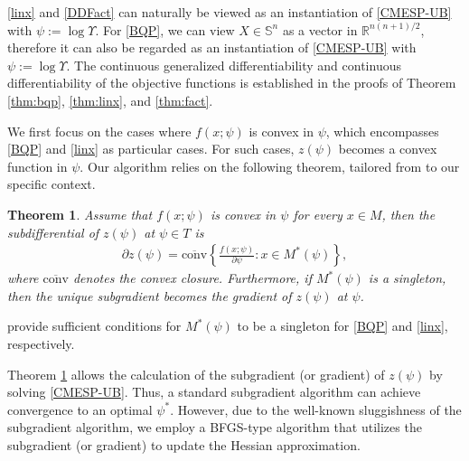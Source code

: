 \documentclass[smallextended]{svjour3hack}       %
\newtheorem{thm}{Theorem}{\bf}{\rm}
\begin{document}
\begin{remark}
    \ref{linx} and \ref{DDFact} can naturally be viewed as an instantiation of \ref{CMESP-UB} with $\psi:=\log \Upsilon$. For \ref{BQP}, we can view $X\in \mathbb{S}^n$ as a vector in $\mathbb{R}^{n(n+1)/2}$, therefore it can also be regarded as an instantiation of \ref{CMESP-UB} with $\psi:=\log \Upsilon$. The continuous generalized differentiability and continuous differentiability of the objective functions is established in the proofs of Theorem \ref{thm:bqp}, \ref{thm:linx}, and \ref{thm:fact}.
\end{remark}

We first focus on the cases where $f(x;\psi)$ is convex in $\psi$, which encompasses \ref{BQP} and \ref{linx} as particular cases. For such cases, $z(\psi)$ becomes a convex function in $\psi$. Our algorithm relies on the following theorem, tailored from \cite[Theorem 2.4.18]{zalinescu2002convex} to our specific context.
\begin{thm}{\cite[Theorem 2.4.18]{zalinescu2002convex}}\label{alg:cvxdifferential}
    Assume that $f(x;\psi)$ is convex in $\psi$ for every $x\in M$, then the subdifferential of $z(\psi)$ at   $\psi\in T$ is
    \begin{align*}
        \partial z(\psi) = \overline{\text{conv}} \left\{\frac{f(x;\psi)}{\partial\psi}: x\in M^*(\psi)\right\},
    \end{align*}
    where $\overline{\text{conv}}$ denotes the convex  closure. Furthermore, if $M^*(\psi)$ is a singleton, then the unique subgradient becomes the gradient of $z(\psi)$ at $\psi$.
\end{thm}
\begin{remark}
    \cite[Propositions 3.3.7 and 3.6.9]{FLbook} provide sufficient conditions for $M^*(\psi)$ to be a singleton for \ref{BQP} and \ref{linx}, respectively.
\end{remark}

Theorem \ref{alg:cvxdifferential} allows the calculation of the subgradient (or gradient) of $z(\psi)$ by solving \ref{CMESP-UB}. Thus, a standard subgradient algorithm can achieve convergence to an optimal $\psi^*$. However, due to the well-known sluggishness of the subgradient algorithm, we employ a BFGS-type algorithm that utilizes the subgradient (or gradient) to update the Hessian approximation.
\end{document}
